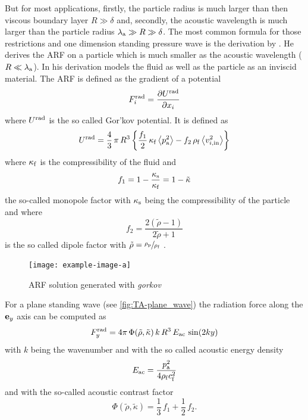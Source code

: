 But for most applications, firstly, the particle radius is much larger than 
then viscous boundary layer $R \gg \delta$ and, secondly, the acoustic 
wavelength is much larger than the particle radius $\lambda_{\mathrm{a}}\gg R 
\gg \delta$. The most common formula for those restrictions and one dimension 
standing pressure wave is the derivation by . He derives the 
ARF on a particle which is much smaller as the acoustic wavelength 
($R\ll\lambda_{\mathrm{a}}$). In his derivation models the fluid as well as the 
particle as an inviscid material. The ARF is defined as the gradient of a 
potential
\begin{equation}
  F^{\mathrm{rad}}_{i} = \pdv{U^{\mathrm{rad}}}{x_{i}}
  \label{eq:TA-gorkov}
\end{equation}
where $U^{\mathrm{rad}}$ is the so called Gor'kov potential. It is defined as
\begin{equation}
  U^{\mathrm{rad}} = \frac{4}{3}\,\pi\,R^{3}\left\{ 
  \frac{f_{1}}{2}\,\kappa_{\mathrm{f}}\left\langle p^{2}_{\mathrm{a}} \right\rangle - 
f_{2}\,\rho_{\mathrm{f}}\left\langle v^{2}_{i,\mathrm{in}} \right\rangle \right\}
    \label{eq:TA-gorkov-potential}
\end{equation}
where $\kappa_{\mathrm{f}}$ is the compressibility of the fluid and
\begin{equation}
  f_{1} = 1 - \frac{\kappa_{\mathrm{s}}}{\kappa_{\mathrm{f}}} = 1 - \tilde{\kappa}
  \label{eq:TA-fone}
\end{equation}
the so-called monopole factor with $\kappa_{\mathrm{s}}$ being the compressibility 
of the particle and where
\begin{equation}
f_{2} = \frac{2(\tilde{\rho}-1)}{2\tilde{\rho}+1}
\label{eq:TA-ftwo}
\end{equation}
is the so called dipole factor with $\tilde{\rho} = \sfrac{\rho_{\mathrm{p}}}{\rho_{\mathrm{f}}}$ 
\cite{Gorkov1962,Bruus2012}.

\begin{figure}
    \texttt{[image: example-image-a]}
    \caption{ARF solution generated with \emph{gorkov}}
  \label{fig:TA-comparision-ARF}
\end{figure}

For a plane standing wave (see \cref{fig:TA-plane_wave}) the radiation force 
along the $\vb{e}_{y}$ axis can be computed as~\cite{Bruus2012}
\begin{equation}
  F_{y}^{\mathrm{rad}} = 
  4\pi\,\Phi(\tilde{\rho},\tilde{\kappa})\,k\,R^{3}\,E_{\mathrm{ac}}\,\sin(2ky)
  \label{eq:TA-ARFy}
\end{equation}
with $k$ being the wavenumber and with the so called acoustic energy density
\begin{equation}
  E_{\mathrm{ac}} = \frac{p_{\mathrm{a}}^{2}}{4\rho_{\mathrm{f}}c_{\mathrm{f}}^{2}}
  \label{eq:TA-Eac}
\end{equation}
and with the so-called acoustic contrast factor
\begin{equation}
  \Phi(\tilde{\rho},\tilde{\kappa}) = \frac{1}{3}\,f_{1} + \frac{1}{2}\,f_{2}.
  \label{eq:TA-Phi}
\end{equation}

